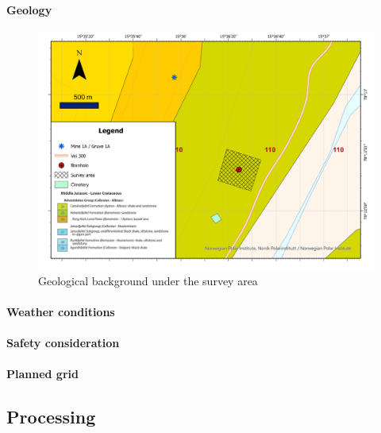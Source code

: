\paragraph{Geology}

\begin{figure} [H]
    \centering
    \includegraphics[width=\linewidth]{Images/00_Methodology/GeologicalSituationMap.jpg}
    \caption{Geological background under the survey area \cite{Atakan2015GeoscienceSvalbard}}
    \label{fig:GeologicalBackground}
\end{figure}

\paragraph{Weather conditions}

\paragraph{Safety consideration}

\paragraph{Planned grid}


\subsection{Processing}